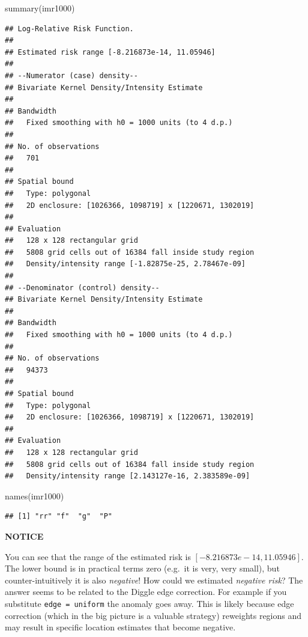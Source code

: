 \documentclass[
]{book}
\newenvironment{Shaded}{\begin{snugshade}}{\end{snugshade}}
\newcommand{\FunctionTok}[1]{\textcolor[rgb]{0.00,0.00,0.00}{#1}}
\newcommand{\NormalTok}[1]{#1}
\newenvironment{rmdcaution}[1]
  {
  \begin{itemize}
  \renewcommand{\labelitemi}{
    \raisebox{-.7\height}[0pt][0pt]{
      {\setkeys{Gin}{width=3em,keepaspectratio}\texttt{[image: images/\#1]}}
    }
  }
  \setlength{\fboxsep}{1em}
  \begin{caution}
  \item
  }
  {
  \end{caution}
  \end{itemize}
  }
\begin{document}
\begin{Shaded}
\begin{Highlighting}[]
\FunctionTok{summary}\NormalTok{(imr1000)}
\end{Highlighting}
\end{Shaded}

\begin{verbatim}
## Log-Relative Risk Function.
## 
## Estimated risk range [-8.216873e-14, 11.05946]
## 
## --Numerator (case) density--
## Bivariate Kernel Density/Intensity Estimate
## 
## Bandwidth
##   Fixed smoothing with h0 = 1000 units (to 4 d.p.)
## 
## No. of observations
##   701 
## 
## Spatial bound
##   Type: polygonal
##   2D enclosure: [1026366, 1098719] x [1220671, 1302019]
## 
## Evaluation
##   128 x 128 rectangular grid
##   5808 grid cells out of 16384 fall inside study region
##   Density/intensity range [-1.82875e-25, 2.78467e-09]
## 
## --Denominator (control) density--
## Bivariate Kernel Density/Intensity Estimate
## 
## Bandwidth
##   Fixed smoothing with h0 = 1000 units (to 4 d.p.)
## 
## No. of observations
##   94373 
## 
## Spatial bound
##   Type: polygonal
##   2D enclosure: [1026366, 1098719] x [1220671, 1302019]
## 
## Evaluation
##   128 x 128 rectangular grid
##   5808 grid cells out of 16384 fall inside study region
##   Density/intensity range [2.143127e-16, 2.383589e-09]
\end{verbatim}

\begin{Shaded}
\begin{Highlighting}[]
\FunctionTok{names}\NormalTok{(imr1000)}
\end{Highlighting}
\end{Shaded}

\begin{verbatim}
## [1] "rr" "f"  "g"  "P"
\end{verbatim}

\begin{rmdcaution}{caution}
\textbf{NOTICE}

You can see that the range of the estimated risk is \([-8.216873e-14, 11.05946]\). The lower bound is in practical terms zero (e.g.~it is very, very small), but counter-intuitively it is also \emph{negative}! How could we estimated \emph{negative risk}? The answer seems to be related to the Diggle edge correction. For example if you substitute \texttt{edge\ =\ \textquotesingle{}uniform\textquotesingle{}} the anomaly goes away. This is likely because edge correction (which in the big picture is a valuable strategy) reweights regions and may result in specific location estimates that become negative.

\end{rmdcaution}
\end{document}
